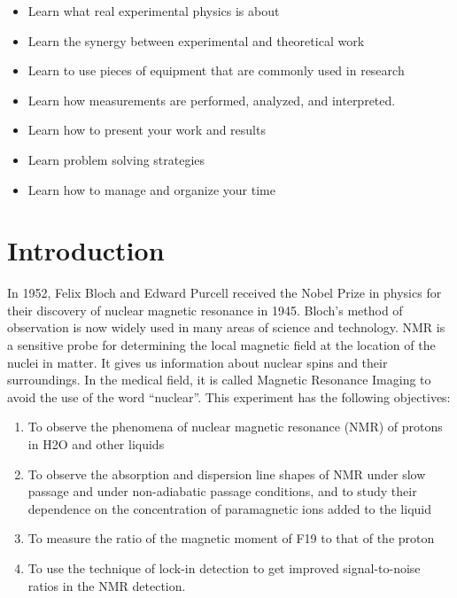 \documentclass{../lab}
\begin{document}
\begin{itemize}
    \item Learn what real experimental physics is about

    \item Learn the synergy between experimental and theoretical work

    \item Learn to use pieces of equipment that are commonly used in research

    \item Learn how measurements are performed, analyzed, and interpreted.

    \item Learn how to present your work and results

    \item Learn problem solving strategies

    \item Learn how to manage and organize your time

\end{itemize}

\section{Introduction}

In 1952, Felix Bloch and Edward Purcell received the Nobel Prize in physics for their discovery of nuclear magnetic resonance in 1945. Bloch's method of observation is now widely used in many areas of science and technology. NMR is a sensitive probe for determining the local magnetic field at the location of the nuclei in matter. It gives us information about nuclear spins and their surroundings. In the medical field, it is called Magnetic Resonance Imaging to avoid the use of the word ``nuclear''. This experiment has the following objectives:

\begin{enumerate}
    \item To observe the phenomena of nuclear magnetic resonance (NMR) of protons in H2O and other liquids

    \item To observe the absorption and dispersion line shapes of NMR under slow passage and under non-adiabatic passage conditions, and to study their dependence on the concentration of paramagnetic ions added to the liquid

    \item To measure the ratio of the magnetic moment of F19 to that of the proton

    \item To use the technique of lock-in detection to get improved signal-to-noise ratios in the NMR detection.

\end{enumerate}
\end{document}
